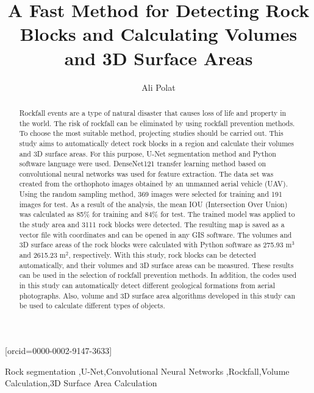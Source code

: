 \documentclass[a4paper,fleqn]{cas-sc}
\begin{document}
\let\WriteBookmarks\relax
\def\floatpagepagefraction{1}
\def\textpagefraction{.001}

\title [mode = title]{A Fast Method for Detecting Rock Blocks and Calculating Volumes and 3D Surface Areas}


\author[0]{Ali Polat}[orcid=0000-0002-9147-3633]




\address[0]{Provincial Directorate of Disaster and Emergency, 58000, Sivas, Turkey}


\begin{abstract}
Rockfall events are a type of natural disaster that causes loss of life and property in the world. The risk of rockfall can be eliminated by using rockfall prevention methods. To choose the most suitable method, projecting studies should be carried out. This study aims to automatically detect rock blocks in a region and calculate their volumes and 3D surface areas. For this purpose, U-Net segmentation method and Python software language were used. DenseNet121 transfer learning method based on convolutional neural networks was used for feature extraction. The data set was created from the orthophoto images obtained by an unmanned aerial vehicle (UAV). Using the random sampling method, 369 images were selected for training and 191 images for test. As a result of the analysis, the mean IOU (Intersection Over Union) was calculated as 85\% for training and 84\% for test. The trained model was applied to the study area and 3111 rock blocks were detected. The resulting map is saved as a vector file with coordinates and can be opened in any GIS software. The volumes and 3D surface areas of the rock blocks were calculated with Python software as 275.93 m$^3$ and 2615.23 m$^2$, respectively. With this study, rock blocks can be detected automatically, and their volumes and 3D surface areas can be measured. These results can be used in the selection of rockfall prevention methods. In addition, the codes used in this study can automatically detect different geological formations from aerial photographs. Also, volume and 3D surface area algorithms developed in this study can be used to calculate different types of objects.
\end{abstract}
 



\begin{keywords}
Rock segmentation \sep U-Net\sep Convolutional Neural Networks \sep Rockfall\sep Volume Calculation\sep 3D Surface Area Calculation
\end{keywords}
\end{document}
